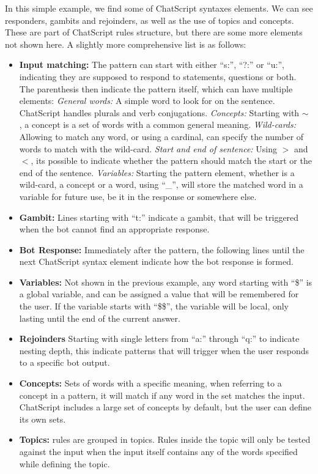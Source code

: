 In this simple example, we find some of ChatScript syntaxes elements. We can see responders, gambits and rejoinders, as well as the use of topics and concepts. These are part of ChatScript rules structure, but there are some more elements not shown here. A slightly more comprehensive list is as follows:
\begin{itemize}
 \item \textbf{Input matching:} The pattern can start with either ``s:'', ``?:'' or ``u:'', indicating they are supposed to respond to statements, questions or both. The parenthesis then indicate the pattern itself, which can have multiple elements:
    \subitem \emph{General words:} A simple word to look for on the sentence. ChatScript handles plurals and verb conjugations.
    \subitem \emph{Concepts:} Starting with $\sim$ , a concept is a set of words with a common general meaning.
    \subitem \emph{Wild-cards:} Allowing to match any word, or using a cardinal, can specify the number of words to match with the wild-card.
    \subitem \emph{Start and end of sentence:} Using $>$ and $<$, its possible to indicate whether the pattern should match the start or the end of the sentence.
    \subitem \emph{Variables: } Starting the pattern element, whether is a wild-card, a concept or a word, using ``\_'', will store the matched word in a variable for future use, be it in the response or somewhere else.
  \item \textbf{Gambit:} Lines starting with ``t:'' indicate a gambit, that will be triggered when the bot cannot find an appropriate response.
  \item \textbf{Bot Response:} Immediately after the pattern, the following lines until the next ChatScript syntax element indicate how the bot response is formed.
  \item \textbf{Variables:} Not shown in the previous example, any word starting with ``\$'' is a global variable, and can be assigned a value that will be remembered for the user. If the variable starts with ``\$\$'', the variable will be local, only lasting until the end of the current answer.
  \item \textbf{Rejoinders} Starting with single letters from ``a:'' through ``q:'' to indicate nesting depth, this indicate patterns that will trigger when the user responds to a specific bot output.
  \item \textbf{Concepts:} Sets of words with a specific meaning, when referring to a concept in a pattern, it will match if any word in the set matches the input. ChatScript includes a large set of concepts by default, but the user can define its own sets.
  \item \textbf{Topics:} rules are grouped in topics. Rules inside the topic will only be tested against the input when the input itself contains any of the words specified while defining the topic.
\end{itemize}

